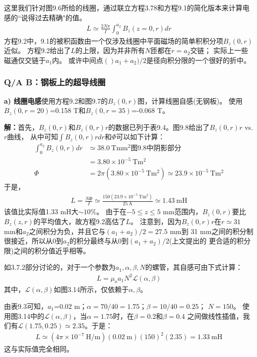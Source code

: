 这里我们针对图9.6所给的线圈，通过联立方程3.78和方程9.1的简化版本来计算电感的``说得过去精确"的值。
\begin{align*}%
L\simeq\frac{2N\pi}{I}\int_{0}^{a_2}B_z(z=0,r)dr \tag{9.2}
\end{align*}
方程9.2中，9.1的被积函数由一个仅涉及线圈中平面磁场的简单积积分项$B_z(0,r)$近似。
方程9.2给出了$L$的上限，因为并非所有$N$匝都在$r=a_2$交链；
实际上一些磁通仅交链于$a_1$内。
或许中间点$()a_1+a_2)/2$是径向积分限的一个很好的折中。


\subsubsection{Q/A B：钢板上的超导线圈}
\textbf{a) 线圈电感}\qquad 使用方程9.2和图9.7的$B_z(0,r)$图，计算线圈自感(无钢板)。
使用$B_z(0,r=20)$=0.158 T和$B_z(0,r=35)$=-0.068 T。

\textbf{解：}首先，$B_z(0,r)$和$B_z(0,r)r$的数据已列于表9.4。图9.8给出了$B_z(0,r)r$ vs. $r$曲线，
从中可知$\int B_z(0,r)rdr$和$\Phi$可以如下计算：
\begin{align*}%
\int_{0}^{a_2}B_z(0,r)dr&\simeq 38.0\ \mathrm{T mm^2}\mbox{图9.8中阴影部分}\\
&=3.80\times 10^{-5}\ \mathrm{Tm^2}\\
\Phi&=2\pi(3.80\times 10^{-5}\ \mathrm{Tm^2})\simeq 23.9\times 10^{-5}\ \mathrm{Tm^2}
\end{align*}
于是，
\begin{align*}%
L=\frac{N\Phi}{I}\simeq\frac{150(23.9\times 10^{-5}\ \mathrm{Tm^2})}{25\ \mathrm{A}}\simeq 1.43\ \mathrm{mH}
\end{align*}
该值比实际值1.33 mH大$\sim 10\%$。
由于在$-5\le z\le 5$ mm范围内，$B_z(0,r)$要比$B_z(z,r)$的平均值大，故方程9.2高估了$L$。
注意到，因为$B_z(0,r)r$在$r\simeq31$ mm和$a_2$之间积分为负，并且它与$(a_1+a_2)/2=27.5$ mm到
31 mm之间的积分制很接近，所以从0到$a_2$的积分最终与从0到$(a_1+a_2)/2$(上文提出的
更合适的积分限)之间的积分值近乎相等。

如3.7.2部分讨论的，对于一个参数为$a_1,\alpha,\beta,N$的螺管，其自感可由下式计算：
\begin{align*}%
L=\mu_oa_1N^2\mathcal{L}(\alpha,\beta) \tag{3.81}
\end{align*}
其中，$\mathcal{L}(\alpha,\beta)$如图3.14所示，仅依赖于$\alpha,\beta$。

由表9.3可知，$a_1$=0.02 m；$\alpha=70/40=1.75$；$\beta=10/40=0.25$；
$N=150$。
使用图3.14中的$\mathcal{L}(\alpha,\beta)$，当$\alpha=1.75$时，在$\beta=0.2$和$\beta=0.4$
之间做线性插值，我们有$\mathcal{L}(1.75,0.25)\simeq2.35$。于是：
\begin{align*}%
L\simeq(4\pi\times 10^{-7}\ \mathrm{H/m})(0.02\ \mathrm{m})(150)^2(2.35)=1.33\ \mathrm{mH}
\end{align*}
这与实际值完全相同。


